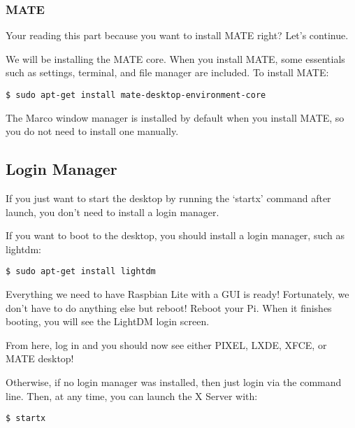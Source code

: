 		\subsubsection*{MATE}
		
			Your reading this part because you want to install MATE right? Let's continue.
			
			We will be installing the MATE core. When you install MATE, some essentials such as settings, terminal, and file manager are included. To install MATE:
\begin{lstlisting}[breaklines=true]
$ sudo apt-get install mate-desktop-environment-core
\end{lstlisting}		

			The Marco window manager is installed by default when you install MATE, so you do not need to install one manually.
			
	\subsection{Login Manager}
	
		If you just want to start the desktop by running the `startx' command after launch, you don't need to install a login manager.
		
		If you want to boot to the desktop, you should install a login manager, such as lightdm:
		
\begin{lstlisting}[breaklines=true]
$ sudo apt-get install lightdm
\end{lstlisting}

		Everything we need to have Raspbian Lite with a GUI is ready! Fortunately, we don't have to do anything else but reboot! Reboot your Pi. When it finishes booting, you will see the LightDM login screen.
		
		From here, log in and you should now see either PIXEL, LXDE, XFCE, or MATE desktop!
 
		 Otherwise, if no login manager was installed, then just login via the command line. Then, at any time, you can launch the X Server with:
\begin{lstlisting}[breaklines=true]
$ startx
\end{lstlisting}
